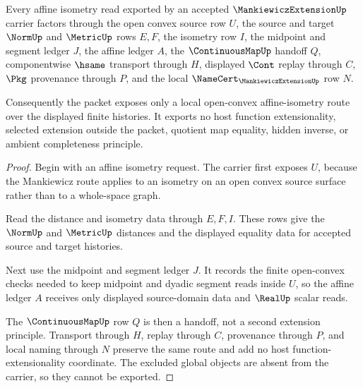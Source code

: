\begin{theorem}
\label{thm:mankiewicz-extension-affine-isometry-route}
Every affine isometry read exported by an accepted $\MankiewiczExtensionUp$ carrier factors through the open convex source row $U$, the source and target $\NormUp$ and $\MetricUp$ rows $E,F$, the isometry row $I$, the midpoint and segment ledger $J$, the affine ledger $A$, the $\ContinuousMapUp$ handoff $Q$, componentwise $\hsame$ transport through $H$, displayed $\Cont$ replay through $C$, $\Pkg$ provenance through $P$, and the local $\NameCert_{\MankiewiczExtensionUp}$ row $N$.

Consequently the packet exposes only a local open-convex affine-isometry route over the displayed finite histories. It exports no host function extensionality, selected extension outside the packet, quotient map equality, hidden inverse, or ambient completeness principle.
\end{theorem}
\begin{proof}
Begin with an affine isometry request. The carrier first exposes $U$, because the Mankiewicz route applies to an isometry on an open convex source surface rather than to a whole-space graph.

Read the distance and isometry data through $E,F,I$. These rows give the $\NormUp$ and $\MetricUp$ distances and the displayed equality data for accepted source and target histories.

Next use the midpoint and segment ledger $J$. It records the finite open-convex checks needed to keep midpoint and dyadic segment reads inside $U$, so the affine ledger $A$ receives only displayed source-domain data and $\RealUp$ scalar reads.

The $\ContinuousMapUp$ row $Q$ is then a handoff, not a second extension principle. Transport through $H$, replay through $C$, provenance through $P$, and local naming through $N$ preserve the same route and add no host function-extensionality coordinate. The excluded global objects are absent from the carrier, so they cannot be exported.
\end{proof}


